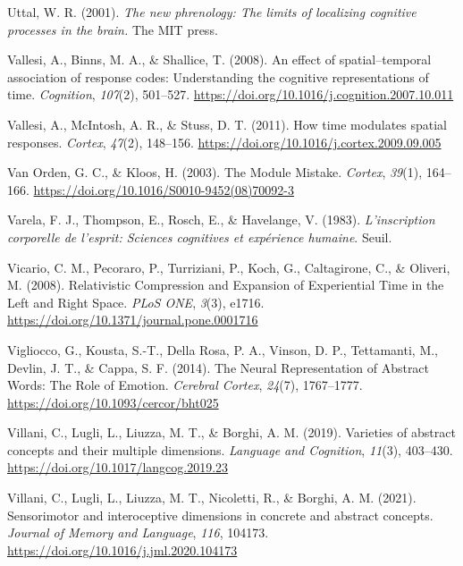 \documentclass[
  a4paper,12pt,twoside,onecolumn,openright,final,oldfontcommands]{memoir}
\newlength{\cslhangindent}
\newlength{\cslentryspacingunit} %
\newenvironment{CSLReferences}[2] %
 {%
  \setlength{\parindent}{0pt}
  \ifodd #1
  \let\oldpar\par
  \def\par{\hangindent=\cslhangindent\oldpar}
  \fi
  \setlength{\parskip}{#2\cslentryspacingunit}
 }%
 {}
\begin{document}
\begin{CSLReferences}{1}{0}
\leavevmode{}%
Uttal, W. R. (2001). \emph{The new phrenology: {The} limits of localizing cognitive processes in the brain.} The MIT press.

\leavevmode{}%
Vallesi, A., Binns, M. A., \& Shallice, T. (2008). An effect of spatial--temporal association of response codes: {Understanding} the cognitive representations of time. \emph{Cognition}, \emph{107}(2), 501--527. \url{https://doi.org/10.1016/j.cognition.2007.10.011}

\leavevmode{}%
Vallesi, A., McIntosh, A. R., \& Stuss, D. T. (2011). How time modulates spatial responses. \emph{Cortex}, \emph{47}(2), 148--156. \url{https://doi.org/10.1016/j.cortex.2009.09.005}

\leavevmode{}%
Van Orden, G. C., \& Kloos, H. (2003). The {Module} {Mistake}. \emph{Cortex}, \emph{39}(1), 164--166. \url{https://doi.org/10.1016/S0010-9452(08)70092-3}

\leavevmode{}%
Varela, F. J., Thompson, E., Rosch, E., \& Havelange, V. (1983). \emph{L'inscription corporelle de l'esprit: Sciences cognitives et expérience humaine}. Seuil.

\leavevmode{}%
Vicario, C. M., Pecoraro, P., Turriziani, P., Koch, G., Caltagirone, C., \& Oliveri, M. (2008). Relativistic {Compression} and {Expansion} of {Experiential} {Time} in the {Left} and {Right} {Space}. \emph{PLoS ONE}, \emph{3}(3), e1716. \url{https://doi.org/10.1371/journal.pone.0001716}

\leavevmode{}%
Vigliocco, G., Kousta, S.-T., Della Rosa, P. A., Vinson, D. P., Tettamanti, M., Devlin, J. T., \& Cappa, S. F. (2014). The {Neural} {Representation} of {Abstract} {Words}: {The} {Role} of {Emotion}. \emph{Cerebral Cortex}, \emph{24}(7), 1767--1777. \url{https://doi.org/10.1093/cercor/bht025}

\leavevmode{}%
Villani, C., Lugli, L., Liuzza, M. T., \& Borghi, A. M. (2019). Varieties of abstract concepts and their multiple dimensions. \emph{Language and Cognition}, \emph{11}(3), 403--430. \url{https://doi.org/10.1017/langcog.2019.23}

\leavevmode{}%
Villani, C., Lugli, L., Liuzza, M. T., Nicoletti, R., \& Borghi, A. M. (2021). Sensorimotor and interoceptive dimensions in concrete and abstract concepts. \emph{Journal of Memory and Language}, \emph{116}, 104173. \url{https://doi.org/10.1016/j.jml.2020.104173}


\end{CSLReferences}
\end{document}
